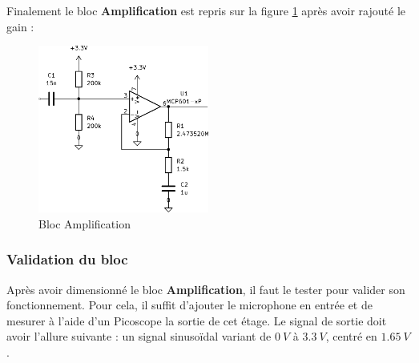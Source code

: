 Finalement le bloc \textbf{Amplification} est repris sur la figure \ref{fig:blocampli} après avoir rajouté le gain :

\begin{figure}[H]
    \centering
    \includegraphics[width=0.5\textwidth]{pdffiles/blocampli.pdf}
    \caption{Bloc Amplification}
    \label{fig:blocampli}
\end{figure}

\subsubsection{Validation du bloc}

Après avoir dimensionné le bloc \textbf{Amplification}, il faut le tester pour valider son fonctionnement. Pour cela, il suffit d'ajouter le microphone en entrée et de mesurer à l'aide d'un Picoscope la sortie de cet étage. Le signal de sortie doit avoir l'allure suivante : un signal sinusoïdal variant de $0 \ V$ à $3.3 \ V$, centré en $1.65 \ V$.